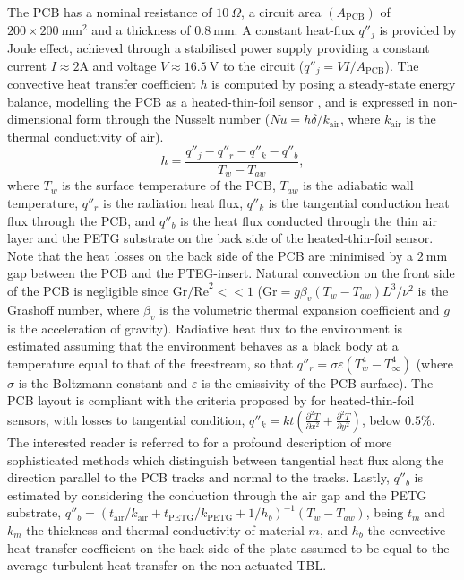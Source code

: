 The PCB has a nominal resistance of $10~\Omega$, a circuit area $(A_{\mathrm{PCB}})$ of $200\times 200~\mathrm{mm}^2$ and a thickness of $0.8~\mathrm{mm}$. A constant heat-flux $q''_{j}$ is provided by Joule effect, achieved through a stabilised power supply providing a constant current $I \approx 2\mathrm{A}$ and voltage $V \approx 16.5~\mathrm{V}$ to the circuit ($q''_{j} = V I / A_{\mathrm{PCB}}$). The convective heat transfer coefficient $h$ is computed by posing a steady-state energy balance, modelling the PCB as a heated-thin-foil sensor \citep{astarita2012infrared}, and is expressed in non-dimensional form through the Nusselt number ($Nu = h \delta/k_{\mathrm{air}}$, where $k_{\mathrm{air}}$ is the thermal conductivity of air).
\begin{equation}
	h = \frac{ q''_{j} - q''_{r} - q''_{k} - q''_{b} }{ T_{w} - T_{aw} } ,
	\label{eq:heatedthinfoil}
\end{equation}
where $T_{w}$ is the surface temperature of the PCB, $T_{aw}$ is the adiabatic wall temperature, $q''_{r}$ is the radiation heat flux, $q''_{k}$ is the tangential conduction heat flux through the PCB, and $q''_{b}$ is the heat flux conducted through the thin air layer and the PETG substrate on the back side of the heated-thin-foil sensor. Note that the heat losses on the back side of the PCB are minimised by a $2~\mathrm{mm}$ gap between the PCB and the PTEG-insert. Natural convection on the front side of the PCB is negligible since $\mathrm{Gr/Re}^2<< 1$ ($\mathrm{Gr} = {g\beta_v(T_{w}-T_{aw}) L^3}/{\nu^2}$ is the Grashoff number, where $\beta_v$ is the volumetric thermal expansion coefficient and $g$ is the acceleration of gravity). Radiative heat flux to the environment is estimated assuming that the environment behaves as a black body at a temperature equal to that of the freestream, so that $q''_{r} = \sigma \varepsilon (T_w^4 - T_\infty^4)$ (where $\sigma$ is the Boltzmann constant and $\varepsilon$ is the emissivity of the PCB surface). The PCB layout is compliant with the criteria proposed by \citet{torre2018HTF} for heated-thin-foil sensors, with losses to tangential condition, $q''_{k} = kt \left( \frac{\partial^2T}{\partial x^2} + \frac{\partial^2T}{\partial y^2} \right)$, below $0.5\%$. The interested reader is referred to \citet{astarita2012infrared} for a profound description of more sophisticated methods which distinguish between tangential heat flux along the direction parallel to the PCB tracks and normal to the tracks. Lastly, $q''_{b}$ is estimated by considering the conduction through the air gap and the PETG substrate, $q''_{b} = \left(t_{\mathrm{air}}/k_{\mathrm{air}}+t_{\mathrm{PETG}}/k_{\mathrm{PETG}}+1/h_b\right)^{-1}(T_{w}-T_{aw})$, being $t_m$ and $k_m$ the thickness and thermal conductivity of material $m$, and $h_b$ the convective heat transfer coefficient on the back side of the plate assumed to be equal to the average turbulent heat transfer on the non-actuated TBL.

